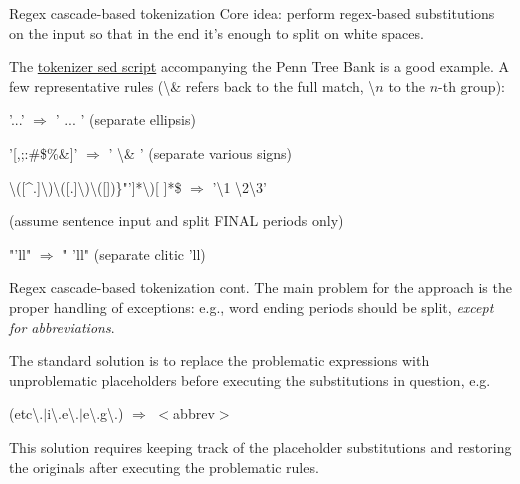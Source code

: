 \documentclass[style=upen, size=14pt]{powerdot}
\theoremstyle{definition}
\begin{document}
\begin{slide}[toc=Regex cascade]{Regex cascade-based tokenization}
  Core idea: perform regex-based substitutions on the input so that in the end
  it's enough to split on white spaces.\bigskip

  The
  \href{ftp://ftp.cis.upenn.edu/pub/treebank/public_html/tokenizer.sed}{tokenizer
    sed script} accompanying the Penn Tree Bank is a good example. A few
  representative rules (\textbackslash \& refers back to the full match,
  \textbackslash $n$ to the $n$-th group):\bigskip

  '...' $\Rightarrow$ ' ... ' (separate ellipsis)
  
  '[,;:\#\$\%\&]' $\Rightarrow$ ' \textbackslash \& ' (separate various signs)

  
  \textbackslash([\^{}.]\textbackslash)\textbackslash([.]\textbackslash)\textbackslash([])\}"']*\textbackslash)[   ]*\$ $\Rightarrow$ '\textbackslash 1 \textbackslash 2\textbackslash 3'

  (assume sentence input and split FINAL periods only)

  "'ll" $\Rightarrow$ " 'll" (separate clitic 'll)
\end{slide}

\begin{slide}[toc=]{Regex cascade-based tokenization cont.}
  The main problem for the approach is the proper handling of exceptions: e.g.,
  word ending periods should be split, \emph{except for abbreviations}.\bigskip

  The standard solution is to replace the problematic expressions with
  unproblematic placeholders before executing the substitutions in question, e.g.\smallskip

  \begin{center}
    (etc\textbackslash.$\vert$i\textbackslash.e\textbackslash.$\vert$e\textbackslash.g\textbackslash.)
    $\Rightarrow$ $<$abbrev$>$
  \end{center}\smallskip
  
  This solution requires keeping track of the placeholder substitutions and
  restoring the originals after executing the problematic rules.
\end{slide}
\end{document}
